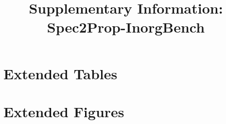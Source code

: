 \documentclass[sn-basic]{sn-jnl}
\begin{document}
\title{Supplementary Information: Spec2Prop-InorgBench}

\section{Extended Tables}


\section{Extended Figures}

\end{document}
